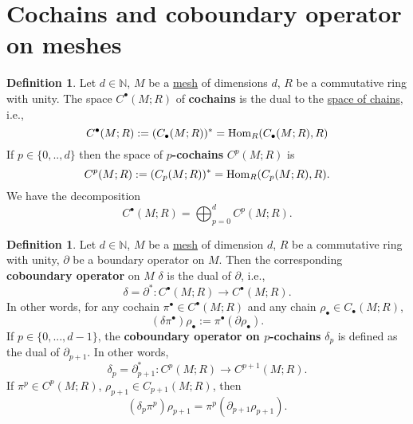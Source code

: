 \documentclass[fleqn]{article}
\theoremstyle{definition}
\newtheorem{definition}[theorem]{Definition}
\newcommand{\N}{\mathbb{N}}
\newcommand{\Hom}{\mathop{\rm Hom}\nolimits}
\begin{document}
\section{Cochains and coboundary operator on meshes}

\begin{definition}
  Let
    $d \in \N$,
    $M$ be a \hyperref[idec:mesh:definition]{mesh} of dimensions $d$,
    $R$ be a commutative ring with unity.
  The space $C^\bullet(M; R)$ of \textbf{cochains} is the dual to the
  \hyperref[idec:mesh_chain:definition]{space of chains}, i.e.,
  \begin{equation}
    C^\bullet(M; R) := (C_\bullet(M; R))^* = \Hom_R(C_\bullet(M; R), R)
  \end{equation}
  If $p \in \{0, .., d\}$ then the space of \textbf{$p$-cochains} $C^p(M; R)$ is
  \begin{equation}
    C^p(M; R) := (C_p(M; R))^* = \Hom_R(C_p(M; R), R).
  \end{equation}
  We have the decomposition
  \begin{equation}
    C^\bullet(M; R) = \bigoplus_{p = 0}^d C^p(M; R).
  \end{equation}
\end{definition}

\begin{definition}
  Let
    $d \in \N$,
    $M$ be a \hyperref[idec:mesh:definition]{mesh} of dimension $d$,
    $R$ be a commutative ring with unity,
    $\partial$ be a boundary operator on $M$.
  Then the corresponding \textbf{coboundary operator} on $M$ $\delta$ is the
  dual of $\partial$, i.e.,
  \begin{equation}
    \delta = \partial^* \colon C^\bullet(M; R) \to C^\bullet(M; R).
  \end{equation}
  In other words, for any cochain $\pi^\bullet \in C^\bullet(M; R)$ and any
  chain $\rho_\bullet \in C_\bullet(M; R)$,
  \begin{equation}
    (\delta \pi^\bullet) \rho_\bullet := \pi^\bullet(\partial \rho_\bullet).
  \end{equation}
  If $p \in \{0, ..., d - 1\}$, the \textbf{coboundary operator on $p$-cochains}
  $\delta_p$ is defined as the dual of $\partial_{p + 1}$.
  In other words,
  \begin{equation}
    \delta_p = \partial_{p + 1}^* \colon C^p(M; R) \to C^{p + 1}(M; R).
  \end{equation}
  If $\pi^p \in C^p(M; R)$, $\rho_{p + 1} \in C_{p + 1}(M; R)$, then
  \begin{equation}
    (\delta_p \pi^p) \rho_{p + 1} = \pi^p(\partial_{p + 1} \rho_{p + 1}).
  \end{equation}
\end{definition}
\end{document}
